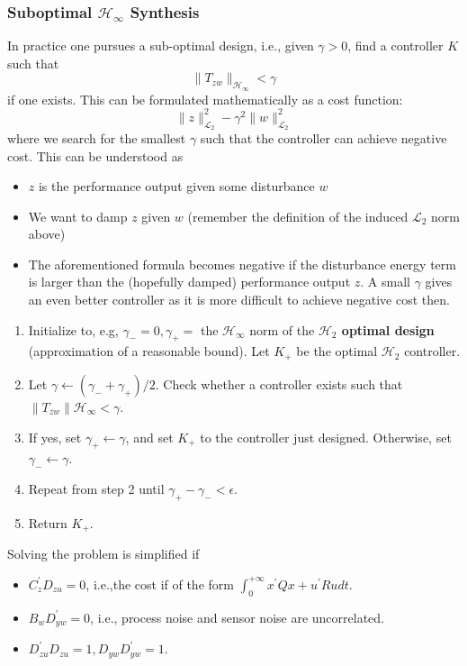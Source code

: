 \subsubsection{Suboptimal \texorpdfstring{$\mathcal{H}_\infty$}{H-infinity} Synthesis}
In practice one pursues a sub-optimal design, i.e., given $\gamma>0$, find a controller $K$ such that
\begin{equation*}
    \|T_{zw}\|_{\mathcal{H}_\infty}<\gamma
\end{equation*}
if one exists. This can be formulated mathematically as a cost function:
\begin{equation*}
    \|z\|_{\mathcal{L}_2}^2-\gamma^2\|w\|_{\mathcal{L}_2}^2
\end{equation*}
where we search for the smallest $\gamma$ such that the controller can achieve negative cost. This can be understood as
\begin{itemize}
    \item $z$ is the performance output given some disturbance $w$
    \item We want to damp $z$ given $w$ (remember the definition of the induced $\mathcal{L}_2$ norm above)
    \item The aforementioned formula becomes negative if the disturbance energy term is larger than the (hopefully damped) performance output $z$. A small $\gamma$ gives an even better controller as it is more difficult to achieve negative cost then.
\end{itemize}


\begin{enumerate}
    \item Initialize to, e.g, $\gamma_-=0,\gamma_+=$ the $\mathcal{H}_\infty$ norm of the \textbf{$\mathcal{H}_2$ optimal design} (approximation of a reasonable bound). Let $K_+$ be the optimal $\mathcal{H}_2$ controller.
    \item Let $\gamma\leftarrow(\gamma_-+\gamma_+)/2$. Check whether a controller exists such that $\|T_{zw}\|\mathcal{H}_\infty<\gamma$.
    \item If yes, set $\gamma_+\leftarrow\gamma$, and set $K_+$ to the controller just designed. Otherwise, set $\gamma_-\leftarrow\gamma$.
    \item Repeat from step 2 until $\gamma_+-\gamma_-<\epsilon$.
    \item Return $K_+$.
\end{enumerate}


Solving the problem is simplified if
\begin{itemize}
    \item $C_{z}^{\prime}D_{zu}=0$, i.e.,the cost if of the form $\int_0^{+\infty}x^{\prime}Qx+u^{\prime}Rudt$.
    \item $B_w D_{yw}^{\prime}=0$, i.e., process noise and sensor noise are uncorrelated.
    \item $D_{zu}^{\prime}D_{zu}=1,D_{yw}D_{yw}^{\prime}=1$.
\end{itemize}

